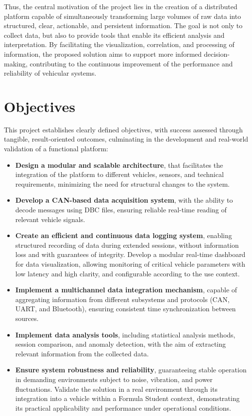 Thus, the central motivation of the project lies in the creation of a distributed platform capable of simultaneously transforming large volumes of raw data into structured, clear, actionable, and persistent information. The goal is not only to collect data, but also to provide tools that enable its efficient analysis and interpretation. By facilitating the visualization, correlation, and processing of information, the proposed solution aims to support more informed decision-making, contributing to the continuous improvement of the performance and reliability of vehicular systems.

\section{Objectives}

This project establishes clearly defined objectives, with success assessed through tangible, result-oriented outcomes, culminating in the development and real-world validation of a functional platform:

\begin{itemize}

\item \textbf{Design a modular and scalable architecture}, that facilitates the integration of the platform to different vehicles, sensors, and technical requirements, minimizing the need for structural changes to the system.

\item \textbf{Develop a CAN-based data acquisition system}, with the ability to decode messages using DBC files, ensuring reliable real-time reading of relevant vehicle signals.

\item \textbf{Create an efficient and continuous data logging system}, enabling structured recording of data during extended sessions, without information loss and with guarantees of integrity. Develop a modular real-time dashboard for data visualization, allowing monitoring of critical vehicle parameters with low latency and high clarity, and configurable according to the use context.

\item \textbf{Implement a multichannel data integration mechanism},  capable of aggregating information from different subsystems and protocols (CAN, UART, and Bluetooth), ensuring consistent time synchronization between sources.

\item \textbf{Implement data analysis tools}, including statistical analysis methods, session comparison, and anomaly detection, with the aim of extracting relevant information from the collected data.

\item \textbf{Ensure system robustness and reliability}, guaranteeing stable operation in demanding environments subject to noise, vibration, and power fluctuations. Validate the solution in a real environment through its integration into a vehicle within a Formula Student context, demonstrating its practical applicability and performance under operational conditions.

\end{itemize}


